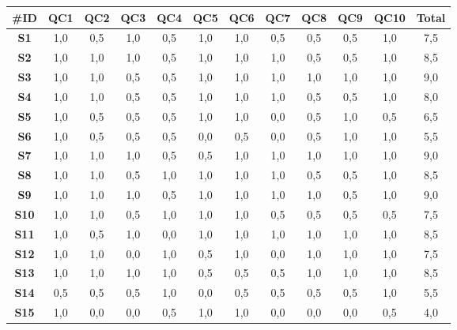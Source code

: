 \begin{table}
    \centering
    \scriptsize
    
    \setlength\tabcolsep{2pt}
    \def\arraystretch{1.4}%
    \begin{tabular}{|c|c|c|c|c|c|c|c|c|c|c||c|} 
    
    \hline
    \textbf{\#ID} & \textbf{QC1} & \textbf{QC2} & \textbf{QC3} & \textbf{QC4} & \textbf{QC5} & \textbf{QC6} & \textbf{QC7} & \textbf{QC8} & \textbf{QC9} & \textbf{QC10} & \textbf{Total} \\
    \hline
    
    \textbf{S1} & 1,0 & 0,5 & 1,0 & 0,5 & 1,0 & 1,0 & 0,5 & 0,5 & 0,5 & 1,0 & 7,5 \\ \hline
    \textbf{S2} & 1,0 & 1,0 & 1,0 & 0,5 & 1,0 & 1,0 & 1,0 & 0,5 & 0,5 & 1,0 & 8,5 \\ \hline
    \textbf{S3} & 1,0 & 1,0 & 0,5 & 0,5 & 1,0 & 1,0 & 1,0 & 1,0 & 1,0 & 1,0 & 9,0 \\ \hline
    \textbf{S4} & 1,0 & 1,0 & 0,5 & 0,5 & 1,0 & 1,0 & 1,0 & 0,5 & 0,5 & 1,0 & 8,0 \\ \hline
    \textbf{S5} & 1,0 & 0,5 & 0,5 & 0,5 & 1,0 & 1,0 & 0,0 & 0,5 & 1,0 & 0,5 & 6,5 \\ \hline
    \textbf{S6} & 1,0 & 0,5 & 0,5 & 0,5 & 0,0 & 0,5 & 0,0 & 0,5 & 1,0 & 1,0 & 5,5 \\ \hline
    \textbf{S7} & 1,0 & 1,0 & 1,0 & 0,5 & 0,5 & 1,0 & 1,0 & 1,0 & 1,0 & 1,0 & 9,0 \\ \hline
    \textbf{S8} & 1,0 & 1,0 & 0,5 & 1,0 & 1,0 & 1,0 & 1,0 & 0,5 & 0,5 & 1,0 & 8,5 \\ \hline
    \textbf{S9} & 1,0 & 1,0 & 1,0 & 0,5 & 1,0 & 1,0 & 1,0 & 1,0 & 0,5 & 1,0 & 9,0 \\ \hline
    \textbf{S10} & 1,0 & 1,0 & 0,5 & 1,0 & 1,0 & 1,0 & 0,5 & 0,5 & 0,5 & 0,5 & 7,5 \\ \hline
    \textbf{S11} & 1,0 & 0,5 & 1,0 & 0,0 & 1,0 & 1,0 & 1,0 & 1,0 & 1,0 & 1,0 & 8,5 \\ \hline
    \textbf{S12} & 1,0 & 1,0 & 0,0 & 1,0 & 0,5 & 1,0 & 0,0 & 1,0 & 1,0 & 1,0 & 7,5 \\ \hline
    \textbf{S13} & 1,0 & 1,0 & 1,0 & 1,0 & 0,5 & 0,5 & 0,5 & 1,0 & 1,0 & 1,0 & 8,5 \\ \hline
    \textbf{S14} & 0,5 & 0,5 & 0,5 & 1,0 & 0,0 & 0,5 & 0,5 & 0,5 & 0,5 & 1,0 & 5,5 \\ \hline
    \textbf{S15} & 1,0 & 0,0 & 0,0 & 0,5 & 1,0 & 1,0 & 0,0 & 0,0 & 0,0 & 0,5 & 4,0 \\ \hline

\end{tabular}
\end{table}
